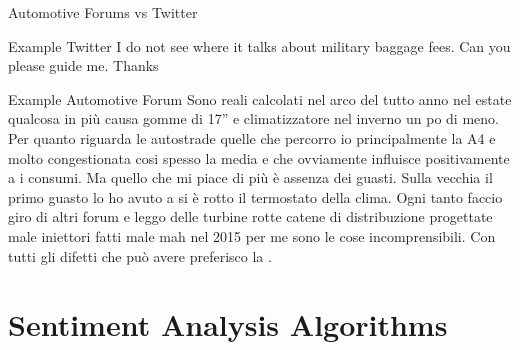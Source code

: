 \documentclass{beamer}
\begin{document}
	
	
	\begin{frame}{Automotive Forums vs Twitter}
		
		\begin{exampleblock}{Example Twitter}
			 I do not see where it talks about military baggage fees. Can you please guide me. Thanks 
		\end{exampleblock}
		
		\begin{exampleblock}{Example Automotive Forum}
			{\scriptsize
				Sono reali calcolati nel arco del tutto anno nel estate qualcosa in più causa
				gomme di 17” e climatizzatore nel inverno un po di meno. Per quanto
				riguarda le autostrade quelle che percorro io principalmente la A4 e molto
				congestionata cosi spesso la media e  che ovviamente influisce
				positivamente a i consumi. Ma quello che mi piace di più è assenza dei
				guasti. Sulla vecchia  il primo guasto lo ho avuto a  si è
				rotto il termostato della clima. Ogni tanto faccio giro di altri forum e leggo
				delle turbine rotte catene di distribuzione progettate male iniettori fatti male
				mah nel 2015 per me sono le cose incomprensibili. Con tutti gli difetti che
				può avere preferisco la .}
		\end{exampleblock}
		
	\end{frame}




	\section{Sentiment Analysis Algorithms}
	
%		
%		
%	
\end{document}

